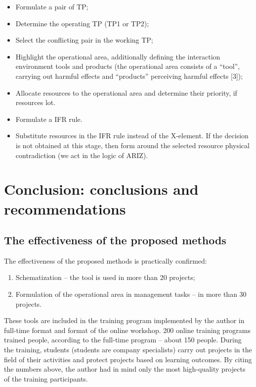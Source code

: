 \documentclass[11pt,a4paper]{book}
\begin{document}
\begin{itemize}
\item Formulate a pair of TP;
\item Determine the operating TP (TP1 or TP2);
\item Select the conflicting pair in the working TP;
\item Highlight the operational area, additionally defining the interaction
  environment tools and products (the operational area consists of a “tool”,
  carrying out harmful effects and “products” perceiving harmful effects [3]);
\item Allocate resources to the operational area and determine their priority,
  if resources lot.
\item Formulate a IFR rule.
\item Substitute resources in the IFR rule instead of the X-element. If the
  decision is not obtained at this stage, then form around the selected
  resource physical contradiction (we act in the logic of ARIZ).
\end{itemize}

\chapter{Conclusion: conclusions and recommendations}

\section{The effectiveness of the proposed methods}

The effectiveness of the proposed methods is practically confirmed:
\begin{enumerate}
\item Schematization -- the tool is used in more than 20 projects;
\item Formulation of the operational area in management tasks -- in more than
  30 projects.
\end{enumerate}
These tools are included in the training program implemented by the author in
full-time format and format of the online workshop. 200 online training
programs trained people, according to the full-time program -- about 150
people.  During the training, students (students are company specialists)
carry out projects in the field of their activities and protect projects based
on learning outcomes. By citing the numbers above, the author had in mind only
the most high-quality projects of the training participants.
\end{document}
